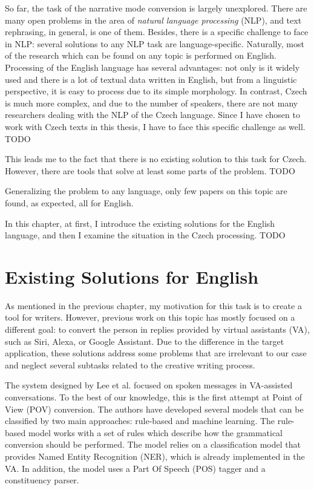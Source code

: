 So far, the task of the narrative mode conversion is largely unexplored. There are many open problems in the area of \emph{natural language processing} (NLP), and text rephrasing, in general, is one of them. Besides, there is a specific challenge to face in NLP: several solutions to any NLP task are language-specific. Naturally, most of the research which can be found on any topic is performed on English. Processing of the English language has several advantages: not only is it widely used and there is a lot of textual data written in English, but from a linguistic perspective, it is easy to process due to its simple morphology. In contrast, Czech is much more complex, and due to the number of speakers, there are not many researchers dealing with the NLP  of the Czech language. Since I have chosen to work with Czech texts in this thesis, I have to face this specific challenge as well. TODO

This leads me to the fact that there is no existing solution to this task for Czech. However, there are tools that solve at least some parts of the problem. TODO

Generalizing the problem to any language, only few papers on this topic are found, as expected, all for English.

In this chapter, at first, I introduce the existing solutions for the English language, and then I examine the situation in the Czech processing. TODO

\section{Existing Solutions for English}

As mentioned in the previous chapter, my motivation for this task is to create a tool for writers. However, previous work on this topic has mostly focused on a different goal: to convert the person in replies provided by virtual assistants (VA), such as Siri, Alexa, or Google Assistant. Due to the difference in the target application, these solutions address some problems that are irrelevant to our case and neglect several subtasks related to the creative writing process.

The system designed by Lee et al. \cite{lee2020converting} focused on spoken messages in VA-assisted conversations. To the best of our knowledge, this is the first attempt at Point of View (POV) conversion. The authors have developed several models that can be classified by two main approaches: rule-based and machine learning. The rule-based model works with a set of rules which describe how the grammatical conversion should be performed. The model relies on a classification model that provides Named Entity Recognition (NER), which is already implemented in the VA. In addition, the model uses a Part Of Speech (POS) tagger and a constituency parser.

